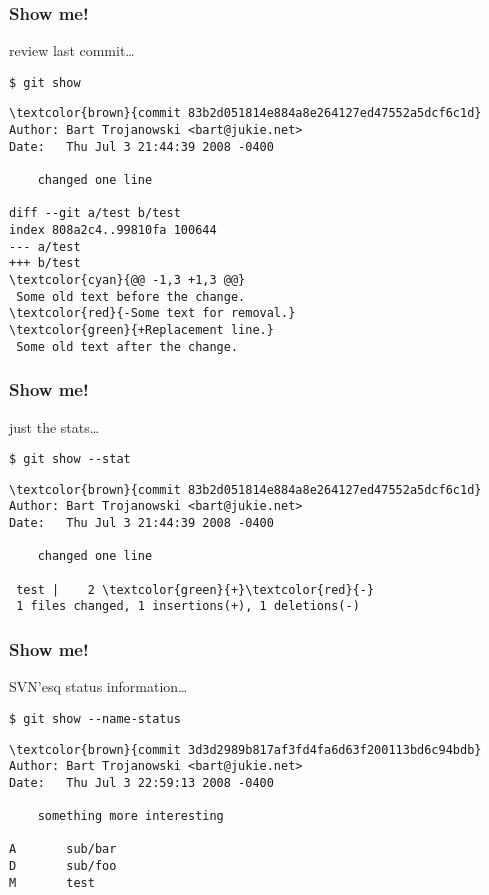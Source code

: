 \documentclass[english]{beamer}
\newcommand{\CMD}[1]{%
\texttt{\textcolor{code-blue}{#1}}%
}
\begin{document}
\begin{frame}[fragile]
\frametitle{Show me!}

review last commit\ldots
\vspace{\baselineskip}

\CMD{\$ git show}
{\small
\begin{Verbatim}[commandchars=\\\{\}]
\textcolor{brown}{commit 83b2d051814e884a8e264127ed47552a5dcf6c1d}
Author: Bart Trojanowski <bart@jukie.net>
Date:   Thu Jul 3 21:44:39 2008 -0400

    changed one line

diff --git a/test b/test
index 808a2c4..99810fa 100644
--- a/test
+++ b/test
\textcolor{cyan}{@@ -1,3 +1,3 @@}
 Some old text before the change.
\textcolor{red}{-Some text for removal.}
\textcolor{green}{+Replacement line.}
 Some old text after the change.
\end{Verbatim}
}
\vspace{\textheight}
\end{frame}

\begin{frame}[fragile]
\frametitle{Show me!}

just the stats\ldots
\vspace{\baselineskip}

\CMD{\$ git show {-}-stat}
{\small
\begin{Verbatim}[commandchars=\\\{\}]
\textcolor{brown}{commit 83b2d051814e884a8e264127ed47552a5dcf6c1d}
Author: Bart Trojanowski <bart@jukie.net>
Date:   Thu Jul 3 21:44:39 2008 -0400

    changed one line

 test |    2 \textcolor{green}{+}\textcolor{red}{-}
 1 files changed, 1 insertions(+), 1 deletions(-)
\end{Verbatim}
}
\vspace{\textheight}
\end{frame}

\begin{frame}[fragile]
\frametitle{Show me!}

SVN'esq status information\ldots
\vspace{\baselineskip}

\CMD{\$ git show {-}-name-status}
{\small
\begin{Verbatim}[commandchars=\\\{\}]
\textcolor{brown}{commit 3d3d2989b817af3fd4fa6d63f200113bd6c94bdb}
Author: Bart Trojanowski <bart@jukie.net>
Date:   Thu Jul 3 22:59:13 2008 -0400

    something more interesting

A       sub/bar
D       sub/foo
M       test
\end{Verbatim}
}
\vspace{\textheight}
\end{frame}
\end{document}
